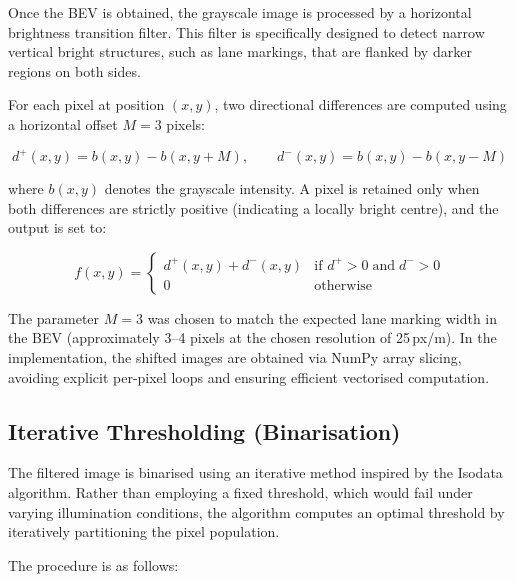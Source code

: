 \documentclass[11pt,a4paper]{article}
\begin{document}
Once the BEV is obtained, the grayscale image is processed by a horizontal brightness transition filter. This filter is specifically designed to detect narrow vertical bright structures, such as lane markings, that are flanked by darker regions on both sides.

For each pixel at position $(x, y)$, two directional differences are computed using a horizontal offset $M = 3$ pixels:

\begin{equation}
    d^{+}(x,y) = b(x,y) - b(x,y+M), \qquad
    d^{-}(x,y) = b(x,y) - b(x,y-M)
    \label{eq:filter}
\end{equation}

where $b(x,y)$ denotes the grayscale intensity. A pixel is retained only when both differences are strictly positive (indicating a locally bright centre), and the output is set to:

\begin{equation}
    f(x,y) = 
    \begin{cases} 
        d^{+}(x,y) + d^{-}(x,y) & \text{if } d^{+} > 0 \;\text{and}\; d^{-} > 0 \\
        0 & \text{otherwise}
    \end{cases}
    \label{eq:filter_output}
\end{equation}

The parameter $M = 3$ was chosen to match the expected lane marking width in the BEV (approximately 3--4 pixels at the chosen resolution of 25\,px/m). In the implementation, the shifted images are obtained via NumPy array slicing, avoiding explicit per-pixel loops and ensuring efficient vectorised computation.


\subsection{Iterative Thresholding (Binarisation)}
\label{sec:threshold}

The filtered image is binarised using an iterative method inspired by the Isodata algorithm. Rather than employing a fixed threshold, which would fail under varying illumination conditions, the algorithm computes an optimal threshold by iteratively partitioning the pixel population.

The procedure is as follows:
\end{document}
